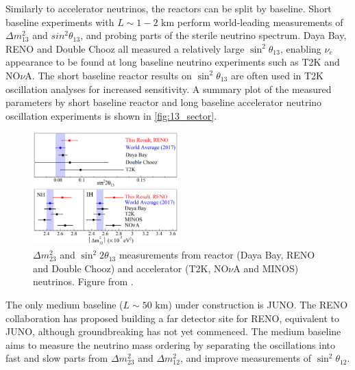 Similarly to accelerator neutrinos, the reactors can be split by baseline. Short baseline experiments with $L\sim1-2\text{ km}$ perform world-leading measurements of $\Delta m^2_{13}$ and $sin^2\theta_{13}$, and probing parts of the sterile neutrino spectrum. Daya Bay\cite{daya_bay_disc}, RENO\cite{reno_disc} and Double Chooz\cite{double_chooz_disc} all measured a relatively large $\sin^2 \theta_{13}$, enabling $\nu_e$ appearance to be found at long baseline neutrino experiments such as T2K and NO$\nu$A. The short baseline reactor results on $\sin^2\theta_{13}$ are often used in T2K oscillation analyses for increased sensitivity. A summary plot of the measured parameters by short baseline reactor and long baseline accelerator neutrino oscillation experiments is shown in \autoref{fig:13_sector}.
\begin{figure}[h]
	\includegraphics[width=0.5\textwidth, trim={0mm 0mm 0mm 0mm}, clip,page=1]{figures/theory/reno_theta_dm13}
	\caption{$\Delta m^2_{23}$ and $\sin^2 2\theta_{13}$ measurements from reactor (Daya Bay\cite{daya_bay}, RENO\cite{reno_new} and Double Chooz\cite{double_chooz_old}) and accelerator (T2K\cite{t2k_2015}, NO$\nu$A\cite{nova_2017} and MINOS\cite{minos_numu_nue}) neutrinos. Figure from \cite{reno_new}.}
	\label{fig:13_sector}
\end{figure}

The only medium baseline ($L\sim50\text{ km}$) under construction is JUNO\cite{juno}. The RENO collaboration has proposed\cite{reno_50} building a far detector site for RENO, equivalent to JUNO, although groundbreaking has not yet commenced. The medium baseline aims to measure the neutrino mass ordering by separating the oscillations into fast and slow parts from $\Delta m^2_{23}$ and $\Delta m^2_{12}$, and improve measurements of $\sin^2 \theta_{12}$.

